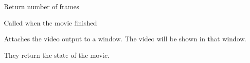 
Return number of frames


\label{wxvideobasedriveronfinished}


Called when the movie finished


\label{wxvideobasedriverattachoutput}


Attaches the video output to a window. The video will be shown in that window.


\label{wxvideobasedriverdetachoutput}



\label{wxvideobasedriverispaused}


They return the state of the movie.


\label{wxvideobasedriverisstopped}


